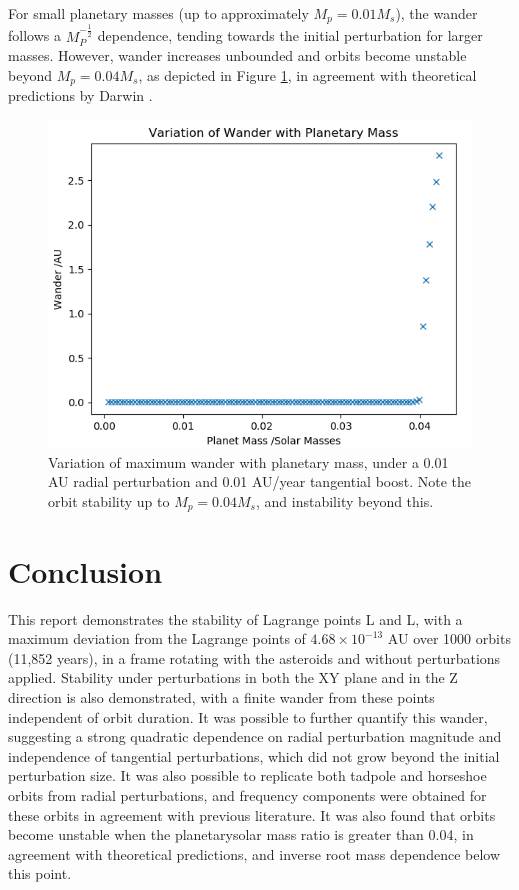 \documentclass[11pt, a4paper,twocolumn]{article} %
\begin{document}
For small planetary masses (up to approximately $ M_{p} = 0.01 M_{s}$), the wander follows a $ M_{P}^{-\frac{1}{2}}$ dependence, tending towards the initial perturbation for larger masses. However, wander increases unbounded and orbits become unstable beyond $ M_{p} = 0.04 M_{s}$, as depicted in Figure \ref{fig:planetmass2}, in agreement with theoretical predictions by Darwin \cite{Darwin1897}.

\begin{figure}
	\centering
	\includegraphics[width=0.8\linewidth]{Figures/wanderwithplanetmass_p6}
	\caption{Variation of maximum wander with planetary mass, under a 0.01 AU radial perturbation and 0.01 AU/year tangential boost. Note the orbit stability up to $ M_{p} = 0.04 M_{s}$, and instability beyond this.}
	\label{fig:planetmass2}
\end{figure}

\section{Conclusion}
This report demonstrates the stability of Lagrange points L and L, with a maximum deviation from the Lagrange points of $4.68 \times 10^{-13}$ AU over 1000 orbits (11,852 years), in a frame rotating with the asteroids and without perturbations applied. Stability under perturbations in both the XY plane and in the Z direction is also demonstrated, with a finite wander from these points independent of orbit duration. It was possible to further quantify this wander, suggesting a strong quadratic dependence on radial perturbation magnitude and independence of tangential perturbations, which did not grow beyond the initial perturbation size.
It was also possible to replicate both tadpole and horseshoe orbits from radial perturbations, and frequency components were obtained for these orbits in agreement with previous literature. It was also found that orbits become unstable when the planetary\textendash solar mass ratio is greater than 0.04, in agreement with theoretical predictions, and inverse root mass dependence below this point.
\end{document}
